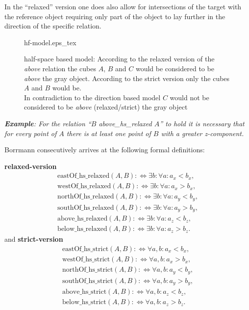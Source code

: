 \documentclass[paper=a4, fontsize=11pt]{scrartcl} %
\numberwithin{equation}{section} %
\numberwithin{figure}{section} %
\numberwithin{table}{section} %
\begin{document}
In the ``relaxed'' version one does also allow for intersections of the target with the reference object requiring only part of the object to lay further in the direction of the specific relation. 

\begin{figure}
  \centering
  \def\svgwidth{20em}
  {hf-model.eps_tex}
  \caption{half-space based model: According to the relaxed version of the \emph{above} relation the cubes $A$, $B$ and $C$ would be considered to be \emph{above} the gray object. According to the strict version only the cubes $A$ and $B$ would be. \\ In contradiction to the direction based model $C$ would not be considered to be \emph{above} (relaxed/strict) the gray object }
\label{fig:direction-model}
\end{figure}

\textit{\textbf{Example}: For the relation ``$B$ above\_hs\_relaxed $A$'' to hold it is necessary that for every point of $A$ there is at least one point of $B$ with a greater z-component. 
}

Borrmann consecutively arrives at the following formal definitions:


\textbf{relaxed-version}
\begin{align*}
  \mathrm{eastOf\_hs\_relaxed}(A,B) :\Leftrightarrow \exists b: \forall a: a_x<b_x,  \\
  \mathrm{westOf\_hs\_relaxed}(A,B) :\Leftrightarrow \exists b: \forall a: a_x>b_x,  \\
  \mathrm{northOf\_hs\_relaxed}(A,B) :\Leftrightarrow \exists b: \forall a: a_y<b_y, \\
  \mathrm{southOf\_hs\_relaxed}(A,B) :\Leftrightarrow \exists b: \forall a: a_y>b_y, \\
  \mathrm{above\_hs\_relaxed}(A,B) :\Leftrightarrow \exists b: \forall a: a_z<b_z,   \\
  \mathrm{below\_hs\_relaxed}(A,B) :\Leftrightarrow \exists b: \forall a: a_z>b_z.
\end{align*}
 and
\textbf{strict-version}
\begin{align*}
  \mathrm{eastOf\_hs\_strict}(A,B) :\Leftrightarrow \forall a,b: a_x<b_x,  \\
  \mathrm{westOf\_hs\_strict}(A,B) :\Leftrightarrow \forall a,b: a_x>b_x,  \\
  \mathrm{northOf\_hs\_strict}(A,B) :\Leftrightarrow \forall a,b: a_y<b_y, \\
  \mathrm{southOf\_hs\_strict}(A,B) :\Leftrightarrow \forall a,b: a_y>b_y, \\
  \mathrm{above\_hs\_strict}(A,B) :\Leftrightarrow \forall a,b: a_z<b_z,   \\
  \mathrm{below\_hs\_strict}(A,B) :\Leftrightarrow \forall a,b: a_z>b_z. 
\end{align*}
\end{document}
